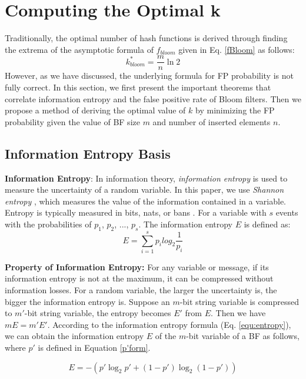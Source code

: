 \presec \section{Computing the Optimal k} \postsec \label{sec:optimalk}
%
Traditionally, the optimal number of hash functions is derived through finding the extrema of the asymptotic formula of $f_{bloom}$ given in Eq. \ref{fBloom} as follows:
%
\begin{equation}
\label{eq:kopt}
k^*_{bloom}=\frac{m}{n}\ln 2
\end{equation}
%
However, as we have discussed, the underlying formula for FP probability is not fully correct. 
%
In this section, we first present the important theorems that correlate information entropy and the false positive rate of Bloom filters.
%
Then we propose a method of deriving the optimal value of $k$ by minimizing the FP probability given the value of BF size $m$ and number of inserted elements $n$.

\presub \subsection{Information Entropy Basis} \postsub
%
\noindent\textbf{Information Entropy}: In information theory, \textit{information entropy} is used to measure the uncertainty of a random variable.
%
In this paper, we use \textit{Shannon entropy} \cite{shannon}, which measures the value of the information contained in a variable. 
%
Entropy is typically measured in bits, nats, or bans \cite{entropy}. 
%
For a variable with $s$ events with the probabilities of $p_1$, $p_2$, ..., $p_s$. 
%
The information entropy $E$ is defined as:
%
\begin{equation}
 E=\sum_{i=1}^{s}p_i  log_2 \dfrac{1}{p_i}
\label{equ:entropy}
\end{equation}

\noindent\textbf{Property of Information Entropy:}
%
For any variable or message, if its information entropy is not at the maximum, it can be compressed without information losses. 
%
For a random variable, the larger the uncertainty is, the bigger the information entropy is.
%
Suppose an $m$-bit string variable is compressed to $m'$-bit string variable, the entropy becomes $E'$ from $E$. 
%
Then we have $mE=m'E'$.
%
According to the information entropy formula (Eq. \ref{equ:entropy}), we can obtain the information entropy $E$ of the $m$-bit variable of a BF as follows, where $p'$ is defined in Equation \ref{p'form}.

\begin{equation}
E=-\left(p'\log_2 p' +(1-p')\log_2(1-p')\right)
\label{equ:entropyBF}
\end{equation}

